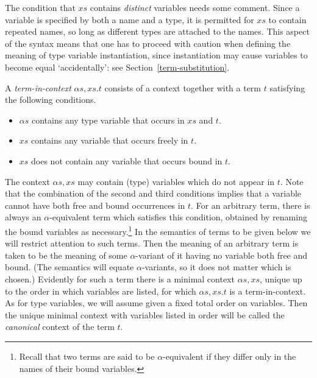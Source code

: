 The condition that $x\!s$ contains {\em distinct\/} variables needs
some comment. Since a variable is specified by both a name and a
type,  it is permitted for $x\!s$ to contain repeated
names,
 so long as different types are attached to the
names. This aspect of the syntax means that one has to proceed with
caution when defining the meaning of type variable instantiation,
since instantiation may cause variables to become equal
`accidentally': see Section~\ref{term-substitution}.

A {\em term-in-context\/}
$\alpha\!s,\!x\!s.t$ consists of a context together with a term
$t$ satisfying the following conditions.
\begin{itemize}

\item $\alpha\!s$ contains any type variable that occurs in $x\!s$ and $t$.

\item $x\!s$ contains any variable that occurs freely in $t$.

\item $x\!s$ does not contain any variable that occurs
bound in $t$.

\end{itemize}
The context $\alpha\!s,\!x\!s$ may contain (type) variables which do
not appear in $t$.  Note that the combination of the second and third
conditions implies that a variable cannot have both free and bound
occurrences in $t$. For an arbitrary term, there is always an
$\alpha$-equivalent term which satisfies this condition, obtained by
renaming the bound variables as necessary.\footnote{Recall that two
terms are said to be $\alpha$-equivalent if they differ only in the
names of their bound variables.} In the semantics of terms to be given
below we will restrict attention to such terms. Then the meaning of an
arbitrary term is taken to be the meaning of some $\alpha$-variant of
it having no variable both free and bound. (The semantics will equate
$\alpha$-variants, so it does not matter which is chosen.) Evidently
for such a term there is a minimal context $\alpha\!s,\!x\!s$, unique
up to the order in which variables are listed, for which
$\alpha\!s,\!x\!s.t$ is a term-in-context. As for type variables, we
will assume given a fixed total order on variables.  Then the unique
minimal context with variables listed in order will be called the {\em
canonical} context of the term $t$.


